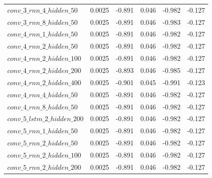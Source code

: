 \documentclass[10pt,twocolumn,letterpaper]{article}
\begin{document}
\begin{table}[ht]
\begin{tabular}{lccccc}
      $conv\_3\_rnn\_4\_hidden\_50$   & 0.0025 & -0.891              & 0.046                    & -0.982             & -0.127                  \\
      $conv\_3\_rnn\_8\_hidden\_50$   & 0.0025 & -0.891              & 0.046                    & -0.983             & -0.127                  \\
      $conv\_4\_rnn\_1\_hidden\_50$   & 0.0025 & -0.891              & 0.046                    & -0.982             & -0.127                  \\
      $conv\_4\_rnn\_2\_hidden\_50$   & 0.0025 & -0.891              & 0.046                    & -0.982             & -0.127                  \\
      $conv\_4\_rnn\_2\_hidden\_100$  & 0.0025 & -0.891              & 0.046                    & -0.982             & -0.127                  \\
      $conv\_4\_rnn\_2\_hidden\_200$  & 0.0025 & -0.893              & 0.046                    & -0.985             & -0.127                  \\
      $conv\_4\_rnn\_2\_hidden\_400$  & 0.0025 & -0.901              & 0.045                    & -0.991             & -0.123                  \\
      $conv\_4\_rnn\_4\_hidden\_50$   & 0.0025 & -0.891              & 0.046                    & -0.982             & -0.127                  \\
      $conv\_4\_rnn\_8\_hidden\_50$   & 0.0025 & -0.891              & 0.046                    & -0.982             & -0.127                  \\
      $conv\_5\_lstm\_2\_hidden\_200$ & 0.0025 & -0.891              & 0.046                    & -0.982             & -0.127                  \\
      $conv\_5\_rnn\_1\_hidden\_50$   & 0.0025 & -0.891              & 0.046                    & -0.982             & -0.127                  \\
      $conv\_5\_rnn\_2\_hidden\_50$   & 0.0025 & -0.891              & 0.046                    & -0.982             & -0.127                  \\
      $conv\_5\_rnn\_2\_hidden\_100$  & 0.0025 & -0.891              & 0.046                    & -0.982             & -0.127                  \\
      $conv\_5\_rnn\_2\_hidden\_200$  & 0.0025 & -0.891              & 0.046                    & -0.982             & -0.127                  \\

\end{tabular}
\end{table}
\end{document}
